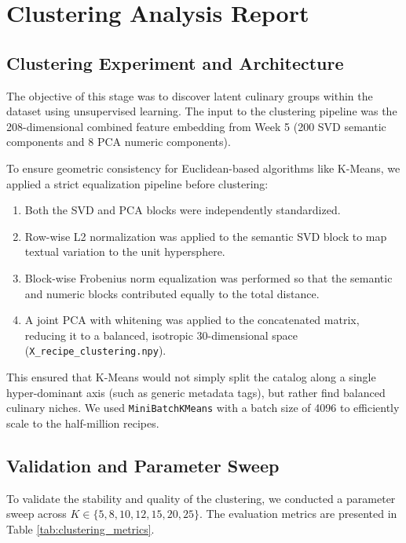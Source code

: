 \documentclass[11pt,a4paper]{article}
\begin{document}
\section{Clustering Analysis Report}

\subsection{Clustering Experiment and Architecture}
The objective of this stage was to discover latent culinary groups within the dataset using unsupervised learning. The input to the clustering pipeline was the 208-dimensional combined feature embedding from Week 5 (200 SVD semantic components and 8 PCA numeric components). 

To ensure geometric consistency for Euclidean-based algorithms like K-Means, we applied a strict equalization pipeline before clustering:
\begin{enumerate}
    \item Both the SVD and PCA blocks were independently standardized.
    \item Row-wise L2 normalization was applied to the semantic SVD block to map textual variation to the unit hypersphere.
    \item Block-wise Frobenius norm equalization was performed so that the semantic and numeric blocks contributed equally to the total distance.
    \item A joint PCA with whitening was applied to the concatenated matrix, reducing it to a balanced, isotropic 30-dimensional space (\texttt{X\_recipe\_clustering.npy}).
\end{enumerate}
This ensured that K-Means would not simply split the catalog along a single hyper-dominant axis (such as generic metadata tags), but rather find balanced culinary niches. We used \texttt{MiniBatchKMeans} with a batch size of 4096 to efficiently scale to the half-million recipes.

\subsection{Validation and Parameter Sweep}
To validate the stability and quality of the clustering, we conducted a parameter sweep across $K \in \{5, 8, 10, 12, 15, 20, 25\}$. The evaluation metrics are presented in Table \ref{tab:clustering_metrics}.
\end{document}
